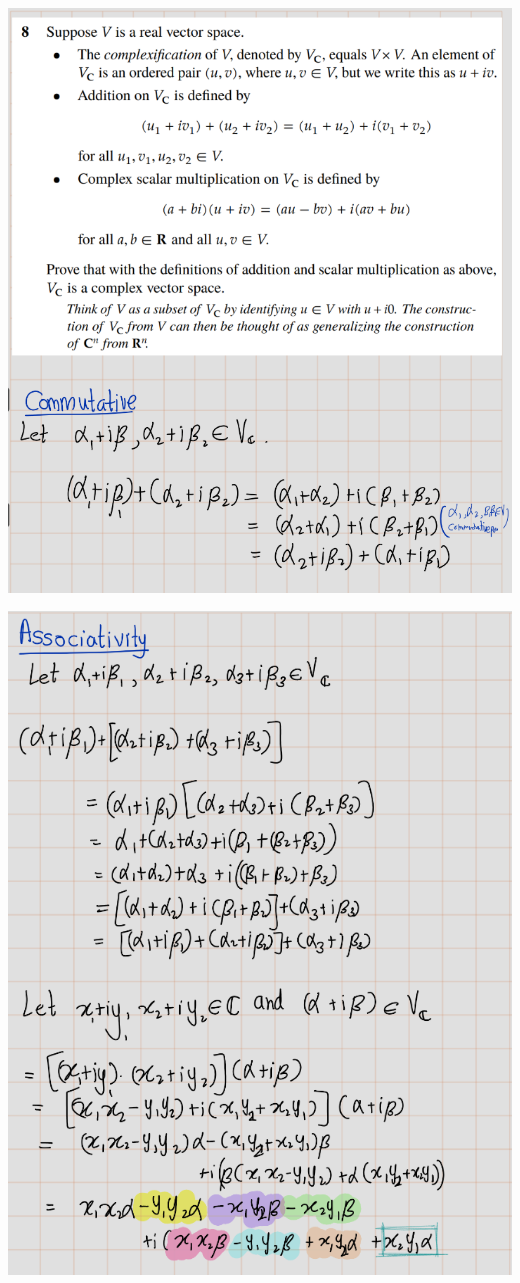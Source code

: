 \documentclass[
]{book}
\theoremstyle{definition}
\theoremstyle{definition}
\theoremstyle{definition}
\theoremstyle{definition}
\theoremstyle{remark}
\begin{document}
\includegraphics[width=9.96in]{fig/Ex1B/Ex8-1}

\includegraphics[width=9.12in]{fig/Ex1B/Ex8-2}
\end{document}

